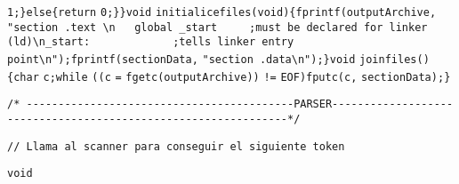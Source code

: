 \color{HotPink1}\verb$1$\color{SeaGreen3}\verb$;$\newline\tab\color{SeaGreen3}\verb$}$\color{Turquoise3}\verb$else$\color{SeaGreen3}\verb${$\newline\tab\tab\color{Turquoise3}\verb$return$ \color{HotPink1}\verb$0$\color{SeaGreen3}\verb$;$\newline\tab\color{SeaGreen3}\verb$}$\newline\color{SeaGreen3}\verb$}$\newline\newline\color{Turquoise3}\verb$void$ \color{Tomato2}\verb$initialicefiles$\color{SeaGreen3}\verb$($\color{Turquoise3}\verb$void$\color{SeaGreen3}\verb$)$\color{SeaGreen3}\verb${$\newline\tab\color{Tomato2}\verb$fprintf$\color{SeaGreen3}\verb$($\color{Tomato2}\verb$outputArchive$\color{SeaGreen3}\verb$,$ \color{Tan2}\verb$"section	.text \n   global _start     ;must be declared for linker (ld)\n_start:	            ;tells linker entry point\n"$\color{SeaGreen3}\verb$)$\color{SeaGreen3}\verb$;$\newline\tab\color{Tomato2}\verb$fprintf$\color{SeaGreen3}\verb$($\color{Tomato2}\verb$sectionData$\color{SeaGreen3}\verb$,$ \color{Tan2}\verb$"section .data\n"$\color{SeaGreen3}\verb$)$\color{SeaGreen3}\verb$;$\newline\color{SeaGreen3}\verb$}$\newline\newline\color{Turquoise3}\verb$void$ \color{Tomato2}\verb$joinfiles$\color{SeaGreen3}\verb$($\color{SeaGreen3}\verb$)$\color{SeaGreen3}\verb${$\newline\tab\color{Turquoise3}\verb$char$ \color{Tomato2}\verb$c$\color{SeaGreen3}\verb$;$\newline\tab\color{Turquoise3}\verb$while$ \color{SeaGreen3}\verb$($\color{SeaGreen3}\verb$($\color{Tomato2}\verb$c$ \color{SeaGreen3}\verb$=$ \color{Tomato2}\verb$fgetc$\color{SeaGreen3}\verb$($\color{Tomato2}\verb$outputArchive$\color{SeaGreen3}\verb$)$\color{SeaGreen3}\verb$)$ \color{DarkOrchid3}\verb$!=$ \color{Tomato2}\verb$EOF$\color{SeaGreen3}\verb$)$\newline\tab\tab\color{Tomato2}\verb$fputc$\color{SeaGreen3}\verb$($\color{Tomato2}\verb$c$\color{SeaGreen3}\verb$,$ \color{Tomato2}\verb$sectionData$\color{SeaGreen3}\verb$)$\color{SeaGreen3}\verb$;$\newline\color{SeaGreen3}\verb$}$\newline\newline\newline\color{Azure4}\begin{verbatim}/* ------------------------------------------PARSER---------------------------------------------------------------*/\end{verbatim}\leavevmode\newline\newline\color{Azure4}\begin{verbatim}// Llama al scanner para conseguir el siguiente token\end{verbatim}\leavevmode\newline\color{Turquoise3}\verb$void$ 
